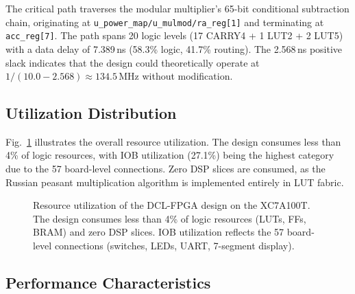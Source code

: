 \documentclass[lettersize,journal]{IEEEtran}
\begin{document}
The critical path traverses the modular multiplier's 65-bit conditional subtraction chain, originating at \texttt{u\_power\_map/u\_mulmod/ra\_reg[1]} and terminating at \texttt{acc\_reg[7]}. The path spans 20 logic levels (17 CARRY4 + 1 LUT2 + 2 LUT5) with a data delay of 7.389\,ns (58.3\% logic, 41.7\% routing). The 2.568\,ns positive slack indicates that the design could theoretically operate at $1/(10.0 - 2.568) \approx 134.5$\,MHz without modification.

\subsection{Utilization Distribution}

Fig.~\ref{fig:util} illustrates the overall resource utilization. The design consumes less than 4\% of logic resources, with IOB utilization (27.1\%) being the highest category due to the 57 board-level connections. Zero DSP slices are consumed, as the Russian peasant multiplication algorithm is implemented entirely in LUT fabric.

\begin{figure}[!t]
\centering
{}
\caption{Resource utilization of the DCL-FPGA design on the XC7A100T. The design consumes less than 4\% of logic resources (LUTs, FFs, BRAM) and zero DSP slices. IOB utilization reflects the 57 board-level connections (switches, LEDs, UART, 7-segment display).}
\label{fig:util}
\end{figure}

\subsection{Performance Characteristics}
\end{document}
